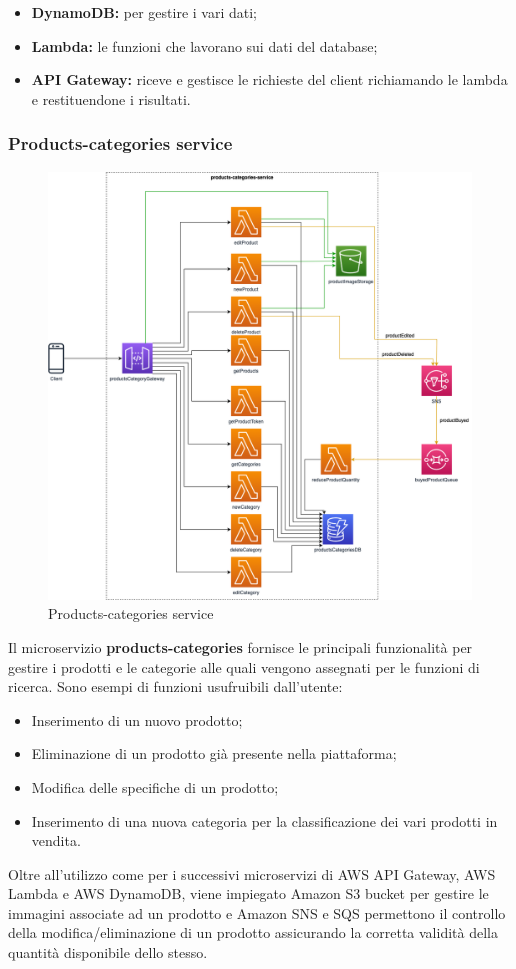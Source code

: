 \begin{itemize}
	\item \textbf{DynamoDB:} per gestire i vari dati;
	\item \textbf{Lambda:} le funzioni che lavorano sui dati del database;
	\item \textbf{API Gateway:} riceve e gestisce le richieste del client richiamando le lambda e restituendone i risultati.
\end{itemize}

\subsubsection{Products-categories service}
\begin{figure}[H]
	\centering
	\includegraphics[scale=0.4]{Immagini/Backend/AWSProductsCategories.png}
	\caption{Products-categories service}
	\label{fig:ProductCategories}
\end{figure}
Il microservizio \textbf{products-categories} fornisce le principali funzionalità per gestire i prodotti e le categorie alle quali vengono assegnati per le funzioni di ricerca. Sono esempi di funzioni usufruibili dall'utente:
\begin{itemize}
	\item Inserimento di un nuovo prodotto;
	\item Eliminazione di un prodotto già presente nella piattaforma;
	\item Modifica delle specifiche di un prodotto;
	\item Inserimento di una nuova categoria per la classificazione dei vari prodotti in vendita.
\end{itemize}\noindent
Oltre all'utilizzo come per i successivi microservizi di AWS API Gateway, AWS Lambda e AWS DynamoDB, viene impiegato Amazon S3 bucket per gestire le immagini associate ad un prodotto e Amazon SNS e SQS permettono il controllo della modifica/eliminazione di un prodotto assicurando la corretta validità della quantità disponibile dello stesso.

